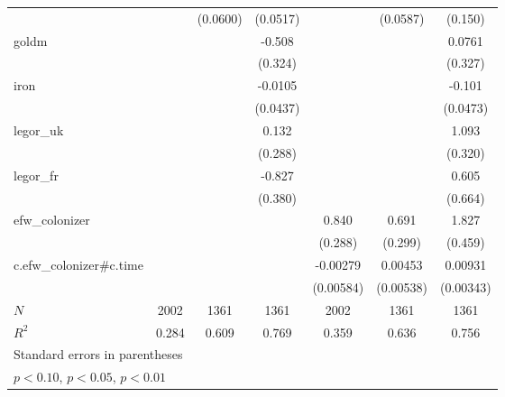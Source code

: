 {\begin{tabular}{l*{6}{c}}
            &                     &    (0.0600)         &    (0.0517)         &                     &    (0.0587)         &     (0.150)         \\
[1em]
goldm       &                     &                     &      -0.508         &                     &                     &      0.0761         \\
            &                     &                     &     (0.324)         &                     &                     &     (0.327)         \\
[1em]
iron        &                     &                     &     -0.0105         &                     &                     &      -0.101         \\
            &                     &                     &    (0.0437)         &                     &                     &    (0.0473)         \\
[1em]
legor\_uk    &                     &                     &       0.132         &                     &                     &       1.093\sym{**} \\
            &                     &                     &     (0.288)         &                     &                     &     (0.320)         \\
[1em]
legor\_fr    &                     &                     &      -0.827\sym{*}  &                     &                     &       0.605         \\
            &                     &                     &     (0.380)         &                     &                     &     (0.664)         \\
[1em]
efw\_colonizer&                     &                     &                     &       0.840\sym{**} &       0.691\sym{*}  &       1.827\sym{**} \\
            &                     &                     &                     &     (0.288)         &     (0.299)         &     (0.459)         \\
[1em]
c.efw\_colonizer#c.time&                     &                     &                     &    -0.00279         &     0.00453         &     0.00931\sym{*}  \\
            &                     &                     &                     &   (0.00584)         &   (0.00538)         &   (0.00343)         \\
\hline
\(N\)       &        2002         &        1361         &        1361         &        2002         &        1361         &        1361         \\
\(R^{2}\)   &       0.284         &       0.609         &       0.769         &       0.359         &       0.636         &       0.756         \\
\hline\hline
\multicolumn{7}{l}{\footnotesize Standard errors in parentheses}\\
\multicolumn{7}{l}{\footnotesize \sym{*} \(p<0.10\), \sym{**} \(p<0.05\), \sym{***} \(p<0.01\)}\\
\end{tabular}
}
